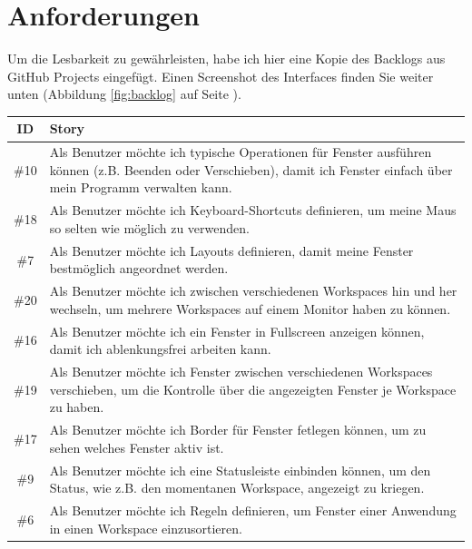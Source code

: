 \documentclass{article}
\begin{document}
\vspace{0em}
\newpage

\section{Anforderungen}

Um die Lesbarkeit zu gewährleisten, habe ich hier eine Kopie des Backlogs aus GitHub Projects eingefügt.
Einen Screenshot des Interfaces finden Sie weiter unten (Abbildung \ref{fig:backlog} auf Seite \pageref{fig:backlog}).

\vspace{1em}

\begin{tabularx}{\textwidth}{|c|X|}
	\hline
	\textbf{ID} & \textbf{Story}                                                                                                                                                          \\
	\hline
	\#10        & Als Benutzer möchte ich typische Operationen für Fenster ausführen können (z.B. Beenden oder Verschieben), damit ich Fenster einfach über mein Programm verwalten kann. \\
	\hline
	\#18        & Als Benutzer möchte ich Keyboard-Shortcuts definieren, um meine Maus so selten wie möglich zu verwenden.                                                                \\
	\hline
	\#7         & Als Benutzer möchte ich Layouts definieren, damit meine Fenster bestmöglich angeordnet werden.                                                                          \\
	\hline
	\#20        & Als Benutzer möchte ich zwischen verschiedenen Workspaces hin und her wechseln, um mehrere Workspaces auf einem Monitor haben zu können.                                \\
	\hline
	\#16        & Als Benutzer möchte ich ein Fenster in Fullscreen anzeigen können, damit ich ablenkungsfrei arbeiten kann.                                                              \\
	\hline
	\#19        & Als Benutzer möchte ich Fenster zwischen verschiedenen Workspaces verschieben, um die Kontrolle über die angezeigten Fenster je Workspace zu haben.                     \\
	\hline
	\#17        & Als Benutzer möchte ich Border für Fenster fetlegen können, um zu sehen welches Fenster aktiv ist.                                                                      \\
	\hline
	\#9         & Als Benutzer möchte ich eine Statusleiste einbinden können, um den Status, wie z.B. den momentanen Workspace, angezeigt zu kriegen.                                     \\
	\hline
	\#6         & Als Benutzer möchte ich Regeln definieren, um Fenster einer Anwendung in einen Workspace einzusortieren.                                                                \\
\end{tabularx}
\end{document}
